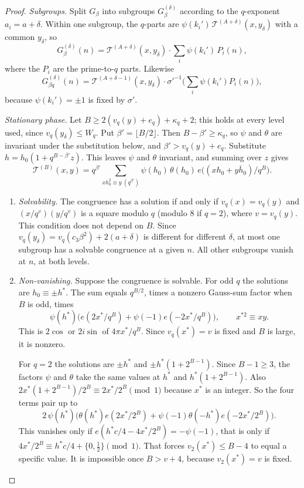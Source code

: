 \documentclass[11pt]{amsart}
\theoremstyle{definition}\newtheorem{definition}[theorem]{Definition}
\theoremstyle{remark}\newtheorem{remark}[theorem]{Remark}
\begin{document}
\begin{proof}
\emph{Subgroups.} Split $G_\beta$ into subgroups $G_\beta^{(\delta)}$ according to the $q$-exponent $a_i=a+\delta$. Within one subgroup, the $q$-parts are $\psi(k_i')\,\mathcal T^{(A+\delta)}(x,y_\delta)$ with a common $y_\delta$, so
\[
G_\beta^{(\delta)}(n)=\mathcal T^{(A+\delta)}(x,y_\delta)\cdot\sum_i\psi(k_i')\,P_i(n),
\]
where the $P_i$ are the prime-to-$q$ parts. Likewise
\[
G_{\beta q}^{(\delta)}(n)=\mathcal T^{(A+\delta-1)}(x,y_\delta)\cdot\sigma'^{-1}\Big(\sum_i\psi(k_i')P_i(n)\Big),
\]
because $\psi(k_i')=\pm1$ is fixed by $\sigma'$.

\emph{Stationary phase.} Let $B\ge 2(v_q(y)+e_q)+\kappa_q+2$; this holds at every level used, since $v_q(y_\delta)\le W_q$. Put $\beta'=\lfloor B/2\rfloor$. Then $B-\beta'\ge\kappa_q$, so $\psi$ and $\theta$ are invariant under the substitution below, and $\beta'>v_q(y)+e_q$. Substitute $h=h_0(1+q^{B-\beta'}z)$. This leaves $\psi$ and $\theta$ invariant, and summing over $z$ gives
\[
\mathcal T^{(B)}(x,y)=q^{\beta'}\sum_{xh_0^2\equiv y\ (q^{\beta'})}\psi(h_0)\,\theta(h_0)\,e\big((xh_0+y\bar h_0)/q^{B}\big).
\]
\begin{enumerate}[label=(\roman*),leftmargin=2em]
\item \emph{Solvability.} The congruence has a solution if and only if $v_q(x)=v_q(y)$ and $(x/q^{v})(y/q^{v})$ is a square modulo $q$ (modulo $8$ if $q=2$), where $v=v_q(y)$. This condition does not depend on $B$. Since $v_q(y_\delta)=v_q(c_3\beta^2)+2(a+\delta)$ is different for different $\delta$, at most one subgroup has a solvable congruence at a given $n$. All other subgroups vanish at $n$, at both levels.
\item \emph{Non-vanishing.} Suppose the congruence is solvable. For odd $q$ the solutions are $h_0\equiv\pm h^\ast$. The sum equals $q^{B/2}$, times a nonzero Gauss-sum factor when $B$ is odd, times
\[
\psi(h^\ast)\big(e(2x^\ast/q^B)+\psi(-1)e(-2x^\ast/q^B)\big),\qquad x^{\ast2}\equiv xy .
\]
This is $2\cos$ or $2i\sin$ of $4\pi x^\ast/q^B$. Since $v_q(x^\ast)=v$ is fixed and $B$ is large, it is nonzero.

For $q=2$ the solutions are $\pm h^\ast$ and $\pm h^\ast(1+2^{B-1})$. Since $B-1\ge3$, the factors $\psi$ and $\theta$ take the same values at $h^\ast$ and $h^\ast(1+2^{B-1})$. Also $2x^\ast(1+2^{B-1})/2^B\equiv2x^\ast/2^B\pmod1$ because $x^\ast$ is an integer. So the four terms pair up to
\[
2\,\psi(h^\ast)\Big(\theta(h^\ast)e(2x^\ast/2^B)+\psi(-1)\theta(-h^\ast)e(-2x^\ast/2^B)\Big).
\]
This vanishes only if $e(h^\ast c/4-4x^\ast/2^B)=-\psi(-1)$, that is only if $4x^\ast/2^B\equiv h^\ast c/4+\{0,\tfrac12\}\pmod1$. That forces $v_2(x^\ast)\le B-4$ to equal a specific value. It is impossible once $B>v+4$, because $v_2(x^\ast)=v$ is fixed.
\end{enumerate}


\end{proof}
\end{document}
